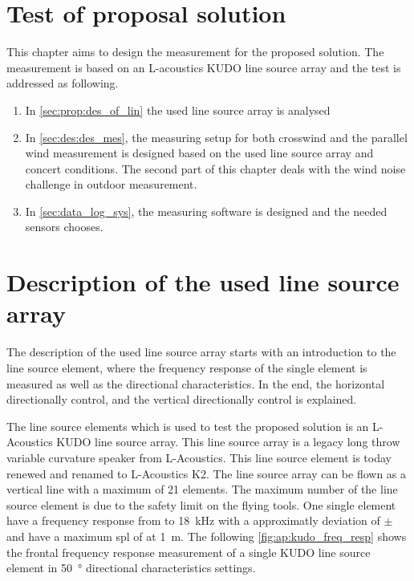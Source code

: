 \section{Test of proposal solution}
This chapter aims to design the measurement for the proposed solution. The measurement is based on an L-acoustics KUDO line source array and the test is addressed as following.




\begin{enumerate}
\item In \autoref{sec:prop:des_of_lin} the used line source array is analysed 
\item In \autoref{sec:des:des_mes}, the measuring setup for both crosswind and the parallel wind measurement is designed based on the used line source array and concert conditions. The second part of this chapter deals with the wind noise challenge in outdoor measurement.
\item In \autoref{sec:data_log_sys}, the measuring software is designed and the needed sensors chooses. 
\end{enumerate}





\section{Description of the used line source array}\label{sec:prop:des_of_lin}

The description of the used line source array starts with an introduction to the line source element, where the frequency response of the single element is measured as well as the directional characteristics. In the end, the horizontal directionally control, and the vertical directionally control is explained.

The line source elements which is used to test the proposed solution is an L-Acoustics KUDO line source array. This line source array is a legacy long throw variable curvature speaker from L-Acoustics. This line source element is today renewed and renamed to L-Acoustics K2. 
The line source array can be flown as a vertical line with a maximum of 21 elements. The maximum number of the line source element is due to the safety limit on the flying tools. 
One single element have a frequency response from  to \SI{18}{\kilo\hertz} with a approximatly deviation of $\pm$  and have a maximum \gls{spl} of  at \SI{1}{\meter}. The following \autoref{fig:ap:kudo_freq_resp} shows the frontal frequency response measurement of a single KUDO line source element in \SI{50}{\degree} directional characteristics settings. 

